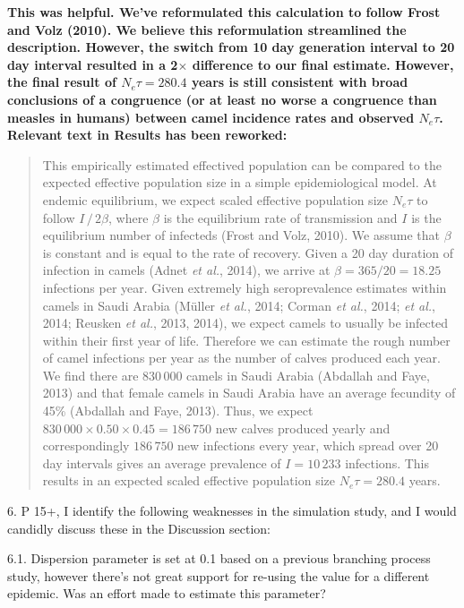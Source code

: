 \documentclass[11pt,oneside,letterpaper]{article}
\begin{document}
\textbf{This was helpful. We've reformulated this calculation to follow Frost and Volz (2010). We believe this reformulation streamlined the description. However, the switch from 10 day generation interval to 20 day interval resulted in a 2$\times$ difference to our final estimate. However, the final result of $N_{e}\tau=280.4$ years is still consistent with broad conclusions of a congruence (or at least no worse a congruence than measles in humans) between camel incidence rates and observed $N_e\tau$. Relevant text in Results has been reworked:}

\begin{quotation}
This empirically estimated effectived population can be compared to the expected effective population size in a simple epidemiological model.
At endemic equilibrium, we expect scaled effective population size $N_{e}\tau$ to follow $I \, / \, 2 \beta$, where $\beta$ is the equilibrium rate of transmission and $I$ is the equilibrium number of infecteds (Frost and Volz, 2010).
We assume that $\beta$ is constant and is equal to the rate of recovery.
Given a 20 day duration of infection in camels (Adnet \textit{et al.}, 2014), we arrive at $\beta = 365/20 = 18.25$ infections per year.
Given extremely high seroprevalence estimates within camels in Saudi Arabia (M\"uller \textit{et al.}, 2014; Corman \textit{et al.}, 2014; \textit{et al.}, 2014; Reusken \textit{et al.}, 2013, 2014), we expect camels to usually be infected within their first year of life.
Therefore we can estimate the rough number of camel infections per year as the number of calves produced each year.
We find there are $830\,000$ camels in Saudi Arabia (Abdallah and Faye, 2013) and that female camels in Saudi Arabia have an average fecundity of 45\% (Abdallah and Faye, 2013).
Thus, we expect $830\,000 \times 0.50 \times 0.45 = 186\,750$ new calves produced yearly and correspondingly $186\,750$ new infections every year, which spread over 20 day intervals gives an average prevalence of $I = 10\,233$ infections.
This results in an expected scaled effective population size $N_{e}\tau=280.4$ years.
\end{quotation}

6. P 15+, I identify the following weaknesses in the simulation study, and I would candidly discuss these in the Discussion section:

6.1. Dispersion parameter is set at 0.1 based on a previous branching process study, however there's not great support for re-using the value for a different epidemic. Was an effort made to estimate this parameter?
\end{document}
